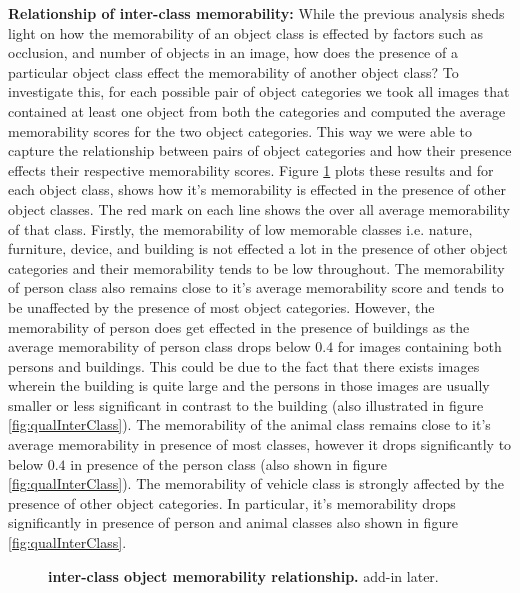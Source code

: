 \textbf{Relationship of inter-class memorability:} While the previous analysis sheds light on how the memorability of an object class is effected by factors such as occlusion, and number of objects in an image, how does the presence of a particular object class effect the memorability of another object class? To investigate this, for each possible pair of object categories we took all images that contained at least one object from both the categories and computed the average memorability scores for the two object categories. This way we were able to capture the relationship between pairs of object categories and how their presence effects their respective memorability scores. Figure \ref{fig:obLabelPair} plots these results and for each object class, shows how it's memorability is effected in the presence of other object classes. The red mark on each line shows the over all average memorability of that class. Firstly, the memorability of low memorable classes i.e. nature, furniture, device, and building is not effected a lot in the presence of other object categories and their memorability tends to be low throughout. The memorability of person class also remains close to it's average memorability score and tends to be unaffected by the presence of most object categories. However, the memorability of person does get effected in the presence of buildings as the average memorability of person class drops below $0.4$ for images containing both persons and buildings. This could be due to the fact that there exists images wherein the building is quite large and the persons in those images are usually smaller or less significant in contrast to the building (also illustrated in figure \ref{fig:qualInterClass}). The memorability of the animal class remains close to it's average memorability in presence of most classes, however it drops significantly to below $0.4$ in presence of the person class (also shown in figure \ref{fig:qualInterClass}). The memorability of vehicle class is strongly affected by the presence of other object categories. In particular, it's memorability drops significantly in presence of person and animal classes also shown in figure \ref{fig:qualInterClass}. 

\begin{figure}[h]
\centering
{}
\vspace{-5mm}\caption{\footnotesize\textbf{inter-class object memorability relationship.} add-in later. }\label{fig:obLabelPair}
\end{figure}

